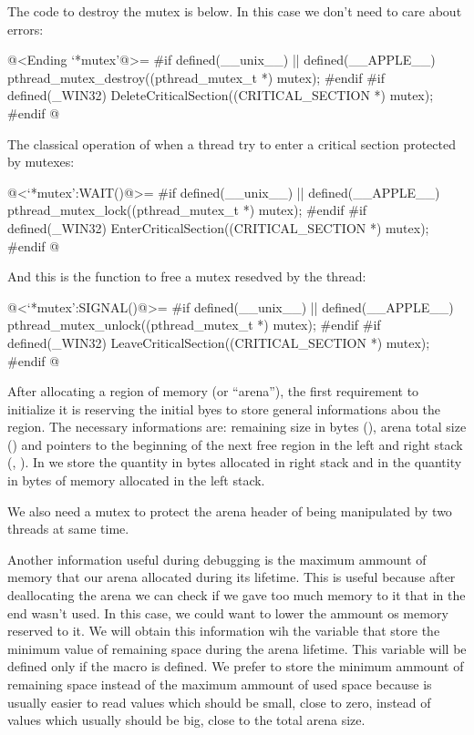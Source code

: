 The code to destroy the mutex is below. In this case we don't need to
care about errors:

\iniciocodigo
@<Ending `*mutex'@>=
#if defined(__unix__) || defined(__APPLE__)
pthread_mutex_destroy((pthread_mutex_t *) mutex);
#endif
#if defined(_WIN32)
DeleteCriticalSection((CRITICAL_SECTION *) mutex);
#endif
@
\fimcodigo

The classical operation of  when a thread try to enter a
critical section protected by mutexes:

\iniciocodigo
@<`*mutex':WAIT()@>=
#if defined(__unix__) || defined(__APPLE__)
pthread_mutex_lock((pthread_mutex_t *) mutex);
#endif
#if defined(_WIN32)
EnterCriticalSection((CRITICAL_SECTION *) mutex);
#endif
@
\fimcodigo

And this is the function  to free a mutex resedved by
the thread:

\iniciocodigo
@<`*mutex':SIGNAL()@>=
#if defined(__unix__) || defined(__APPLE__)
pthread_mutex_unlock((pthread_mutex_t *) mutex);
#endif
#if defined(_WIN32)
LeaveCriticalSection((CRITICAL_SECTION *) mutex);
#endif
@
\fimcodigo


After allocating a region of memory (or ``arena''), the first
requirement to initialize it is reserving the initial byes to store
general informations abou the region. The necessary informations are:
remaining size in bytes (), arena total
size () and pointers to the beginning of the
next free region in the left and right stack
(, ).
In  we store the quantity in bytes
allocated in right stack and in  the
quantity in bytes of memory allocated in the left stack.

We also need a mutex to protect the arena header of being manipulated
by two threads at same time.

Another information useful during debugging is the maximum ammount of
memory that our arena allocated during its lifetime. This is useful
because after deallocating the arena we can check if we gave too much
memory to it that in the end wasn't used. In this case, we could want
to lower the ammount os memory reserved to it. We will obtain this
information wih the variable 
that store the minimum value of remaining space during the arena
lifetime. This variable will be defined only if the
macro  is defined. We prefer to store the
minimum ammount of remaining space instead of the maximum ammount of
used space because is usually easier to read values which should be
small, close to zero, instead of values which usually should be big,
close to the total arena size.

